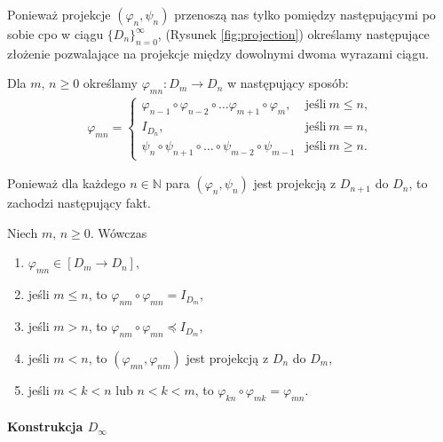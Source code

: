 Ponieważ projekcje \((\varphi_n, \psi_n)\) przenoszą nas tylko pomiędzy następującymi po sobie cpo w ciągu \(\{D_n\}_{n=0}^\infty\), (Rysunek \ref{fig:projection}) określamy następujące złożenie pozwalające na projekcje między dowolnymi dwoma wyrazami ciągu.

\begin{definicja}%
Dla \(m,\,n\geq 0\) określamy \(\varphi_{mn}:D_m \to D_n\) w następujący sposób:
\begin{align*}
\varphi_{mn} =
\begin{cases}
\varphi_{n-1} \circ \varphi_{n-2} \circ \dots \varphi_{m+1} \circ \varphi_m, & \text{jeśli}\ m\leq n,\\
I_{D_n}, & \text{jeśli}\ m=n,\\
\psi_n \circ \psi_{n+1} \circ \dots \circ \psi_{m-2}\circ \psi_{m-1} & \text{jeśli}\ m\geq n.
\end{cases}
\end{align*}
\end{definicja}

Ponieważ dla każdego \(n\in \mathbb{N}\) para \((\varphi_n, \psi_n)\) jest projekcją z \(D_{n+1}\) do \(D_n\), to zachodzi następujący fakt.

\begin{fakt}%
Niech \(m,\,n\geq 0\). Wówczas
\begin{enumerate}[label={(\roman*)}, ref={(\roman*)}] 
  \setlength\itemsep{0em}
\item \(\varphi_{mn}\in [D_m\to D_n]\),
\item jeśli \(m\leq n\), to \(\varphi_{nm}\circ \varphi_{mn} = I_{D_m}\),
\item jeśli \(m>n\), to \(\varphi_{nm}\circ \varphi_{mn} \preceq I_{D_m}\),
\item jeśli \(m<n\), to \((\varphi_{mn},\varphi_{nm})\) jest projekcją z \(D_n\) do \(D_m\),
\item jeśli \(m<k<n\) lub \(n<k<m\), to \(\varphi_{kn}\circ\varphi_{mk}=\varphi_{mn}\).
\end{enumerate}
\end{fakt}

\paragraph{Konstrukcja \(D_\infty\)}

